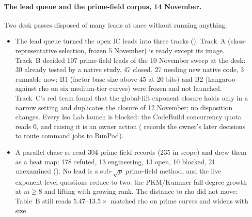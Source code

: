 \paragraph{The lead queue and the prime-field corpus, 14 November.} Two
desk passes disposed of many leads at once without running anything.
\begin{itemize}
\item The lead queue turned the open IC leads into three tracks
  (). Track~A (class-representative
  selection, frozen 5 November) is ready except its image. Track~B decided
  107 prime-field leads of the 10 November sweep at the desk: 30 already
  tested by a native study, 47 closed, 27 needing new native code, 3
  runnable now; B1 (factor-base size above 45 at 20 bits) and B2 (kangaroo
  against rho on six medium-tier curves) were frozen and not launched.
  Track~C's red team found that the global-lift exponent closure holds only
  in a narrow setting and duplicates the closure of 12 November; no
  disposition changes. Every Iso Lab launch is blocked: the CodeBuild
  concurrency quota reads 0, and raising it is an owner action
  ( records the
  owner's later decisions to route command jobs to RunPod).
\item A parallel chase re-read 304 prime-field records (235 in scope) and
  drew them as a heat map: 178 refuted, 13 engineering, 13 open, 10
  blocked, 21 unexamined
  (). No lead is a
  sub-$\sqrt p$ prime-field method, and the live exponent-level questions
  reduce to two: the PKM/Kummer fall-degree growth at $m\ge8$ and lifting
  with growing rank. The distance to rho did not move: Table~B still reads
  $5.47$--$13.5\times$ matched rho on prime curves and widens with size.
\end{itemize}

